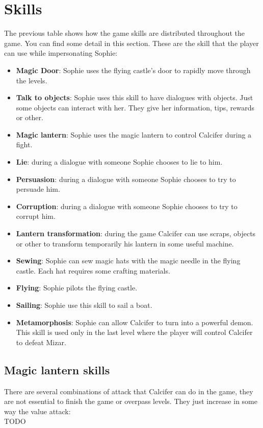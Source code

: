 \section{Skills}
The previous table shows how the game skills are distributed throughout the game. You can find some detail in this section. These are the skill that the player can use while impersonating Sophie:
\begin{itemize}
\item \textbf{Magic Door}: Sophie uses the flying castle's door to rapidly move through the levels.
\item \textbf{Talk to objects}: Sophie uses this skill to have dialogues with objects. Just some objects can interact with her. They give her information, tips, rewards or other.
\item \textbf{Magic lantern}: Sophie uses the magic lantern to control Calcifer during a fight.
\item \textbf{Lie}: during a dialogue with someone Sophie chooses to lie to him.
\item \textbf{Persuasion}: during a dialogue with someone Sophie chooses to try to persuade him.
\item \textbf{Corruption}: during a dialogue with someone Sophie chooses to try to corrupt him.
\item \textbf{Lantern transformation}: during the game Calcifer can use scraps, objects or other to transform temporarily his lantern in some useful machine. %
\item \textbf{Sewing}: Sophie can sew magic hats with the magic needle in the flying castle. Each hat requires some crafting materials.
\item \textbf{Flying}: Sophie pilots the flying castle.
\item \textbf{Sailing}: Sophie use this skill to sail a boat.
\item \textbf{Metamorphosis}: Sophie can allow Calcifer to turn into a powerful demon. This skill is used only in the last level where the player will control Calcifer to defeat Mizar.
\end{itemize}

\subsection{Magic lantern skills}
There are several combinations of attack that Calcifer can do in the game, they are not essential to finish the game or overpass levels. They just increase in some way the value attack:\\
TODO
